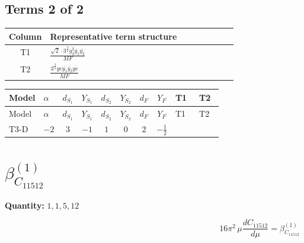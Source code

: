 \documentclass[8pt]{article}
\begin{document}
\begin{landscape}
\subsection*{Terms 2 of 2}
\begin{center}
\begin{tabular}{@{}c >{\raggedright\arraybackslash}p{0.82\linewidth}@{}}
\toprule
Column & Representative term structure \\
\midrule
T1 & \(\displaystyle \frac{\sqrt{2} \cdot 3^{\frac{3}{4}} g_{2}^{2} \overline{y_{1}} \overline{y_{2}}}{MF}\) \\
\midrule
T2 & \(\displaystyle \frac{3^{\frac{3}{4}} ye \overline{y_{1}} \overline{y_{2}} \overline{ye}}{MF}\) \\
\midrule
\bottomrule
\end{tabular}
\end{center}
\smallskip
\tiny
\begin{longtable}{@{}llcccccc >{\raggedright\arraybackslash}p{0.21\linewidth} >{\raggedright\arraybackslash}p{0.21\linewidth}@{}}
\toprule
Model & $\alpha$ & $d_{S_1}$ & $Y_{S_1}$ & $d_{S_2}$ & $Y_{S_2}$ & $d_F$ & $Y_F$ & T1 & T2 \\
\midrule
\endfirsthead
\toprule
Model & $\alpha$ & $d_{S_1}$ & $Y_{S_1}$ & $d_{S_2}$ & $Y_{S_2}$ & $d_F$ & $Y_F$ & T1 & T2 \\
\midrule
\endhead
T3-D & $-2$ & $3$ & $-1$ & $1$ & $0$ & $2$ & $-\frac{1}{2}$ & \scriptsize\adjustbox{max width=\linewidth}{$\begin{gathered} - \frac{\sqrt{2} \cdot 3^{\frac{3}{4}} g_{2}^{2} \overline{y_{1}} \overline{y_{2}}}{3 MF}\end{gathered}$} & \scriptsize\adjustbox{max width=\linewidth}{$\begin{gathered} \frac{3^{\frac{3}{4}} ye \overline{y_{1}} \overline{y_{2}} \overline{ye}}{12 MF}\end{gathered}$} \\
\midrule
\bottomrule
\end{longtable}
\clearpage
\section*{$\beta_{C_{11512}}^{(1)}$}
\noindent\textbf{Quantity: }$\mathrm{1,1,5,12}$\par\smallskip
\[16\pi^2\,\mu\frac{d C_{11512}}{d\mu}=\beta_{C_{11512}}^{(1)}\]

\end{landscape}
\end{document}
